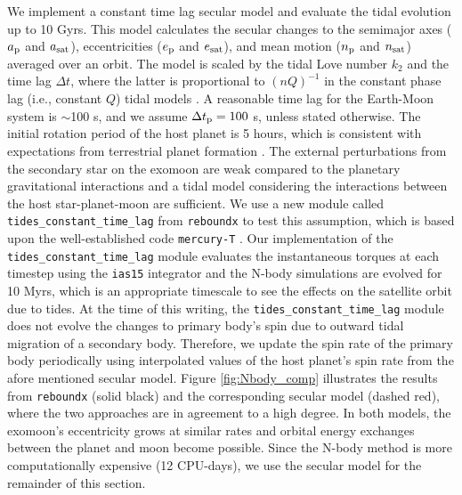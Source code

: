 \documentclass[preprint]{aastex63}
\begin{document}
We implement a constant time lag secular model \citep{Leconte2010, HUT1981} and evaluate the tidal evolution up to 10 Gyrs. This model calculates the secular changes to the semimajor axes ($a_{\rm p}$ and $a_{\rm sat}$), eccentricities ($e_{\rm p}$ and $e_{\rm sat}$), and mean motion ($n_{\rm p}$ and $n_{\rm sat}$) averaged over an orbit.  The model is scaled by the tidal Love number $k_2$ and the time lag $\Delta t$, where the latter is proportional to $(nQ)^{-1}$ in the constant phase lag (i.e., constant $Q$) tidal models \citep{Leconte2010,Piro2018}.  A reasonable time lag for the Earth-Moon system is $\sim$100 s, and we assume $\Delta t_{\rm p} = 100$ s, unless stated otherwise.  The initial rotation period of the host planet is 5 hours, which is consistent with expectations from terrestrial planet formation \citep{Kokubo2007}.  The external perturbations from the secondary star on the exomoon are weak compared to the planetary gravitational interactions and a tidal model considering the interactions between the host star-planet-moon are sufficient.  We use { a new module called \verb|tides_constant_time_lag| from \texttt{reboundx} \citep{Baronett2021}} to test this assumption, which is based upon the well-established code \texttt{mercury-T} \citep{Bolmont2015}.  { Our implementation of the \verb|tides_constant_time_lag| module} evaluates the instantaneous torques at each timestep { using the \texttt{ias15} integrator} and the N-body simulations are evolved for 10 Myrs, which is an appropriate timescale to see the effects on the satellite orbit due to tides.  {At the time of this writing, the} \verb|tides_constant_time_lag| {module does not evolve the changes to primary body's spin due to outward tidal migration of a secondary body.  Therefore, we update the spin rate of the primary body periodically using interpolated values of the host planet's spin rate from the afore mentioned secular model.}  Figure \ref{fig:Nbody_comp} illustrates the results from \texttt{reboundx} (solid black) and the corresponding secular model (dashed red), where the two approaches are in agreement to a high degree.  In both models, the exomoon's eccentricity grows at similar rates and orbital energy exchanges between the planet and moon become possible.  Since the N-body method is more computationally expensive (12 CPU-days), we use the secular model for the remainder of this section.
\end{document}
